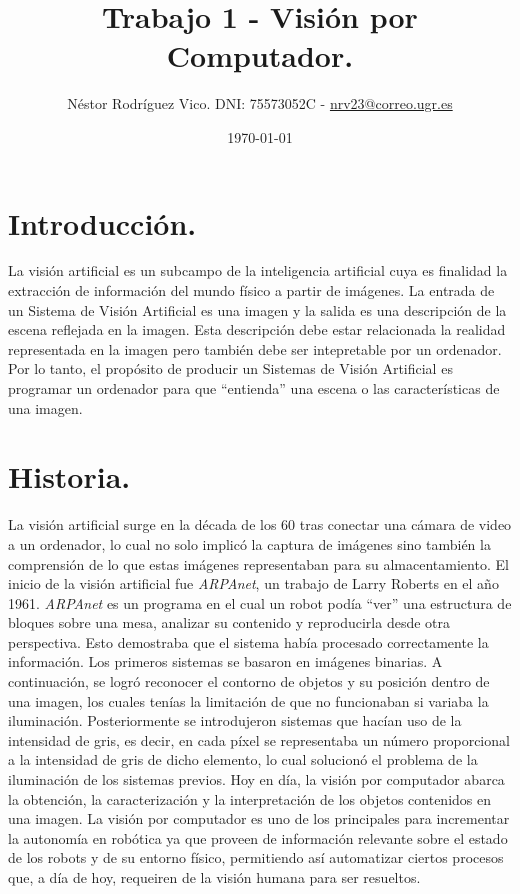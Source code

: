 \documentclass[12pt]{article}
\title{Trabajo 1 - Visión por Computador.}
\author{Néstor Rodríguez Vico. DNI: 75573052C - \href{mailto:nrv23@correo.ugr.es}{nrv23@correo.ugr.es}}
\date{\today}
\begin{document}
\maketitle

\setlength{\belowdisplayskip}{5pt} 
\setlength{\belowdisplayshortskip}{5pt}
\setlength{\abovedisplayskip}{5pt} 
\setlength{\abovedisplayshortskip}{5pt}

\section{Introducción.}

La visión artificial es un subcampo de la inteligencia artificial cuya  es finalidad la extracción de información del mundo físico a partir de imágenes. La entrada de un Sistema de Visión Artificial es una imagen y la salida es una descripción de la escena reflejada en la imagen. Esta descripción debe estar relacionada la realidad representada en la imagen pero también debe ser intepretable por un ordenador. Por lo tanto, el propósito de producir un Sistemas de Visión Artificial es programar un ordenador para que ``entienda'' una escena o las características de una imagen. 

\section{Historia.}

La visión artificial surge en la década de los 60 tras conectar una cámara de video a un ordenador, lo cual no solo implicó la captura de imágenes sino también la comprensión de lo que estas imágenes representaban para su almacentamiento. El inicio de la visión artificial fue \textit{ARPAnet}, un trabajo de Larry Roberts en el año 1961. \textit{ARPAnet} es un programa en el cual un robot podía ``ver'' una estructura de bloques sobre una mesa, analizar su contenido y reproducirla desde otra perspectiva. Esto demostraba que el sistema había procesado correctamente la información. Los primeros sistemas se basaron en imágenes binarias. A continuación, se logró reconocer el contorno de objetos y su posición dentro de una imagen, los cuales tenías la limitación de que no funcionaban si variaba la iluminación. Posteriormente se introdujeron sistemas que hacían uso de la intensidad de gris, es decir, en cada píxel se representaba un número proporcional a la intensidad de gris de dicho elemento, lo cual solucionó el problema de la iluminación de los sistemas previos. Hoy en día, la visión por computador abarca la obtención, la caracterización y la interpretación de los objetos contenidos en una imagen. La visión por computador es uno de los principales para incrementar la autonomía en robótica ya que proveen de información relevante sobre el estado de los robots y de su entorno físico, permitiendo así automatizar ciertos procesos que, a día de hoy, requeiren de la visión humana para ser resueltos.
\end{document}
